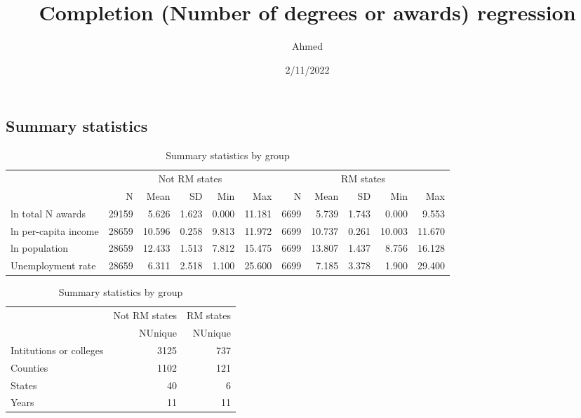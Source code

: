 \documentclass[
  landscape]{article}
\title{Completion (Number of degrees or awards) regression}
\author{Ahmed}
\date{2/11/2022}
\begin{document}
\maketitle

\text{ }

\hypertarget{summary-statistics}{%
\subsection{Summary statistics}\label{summary-statistics}}

\text{ }

\begin{table}

\caption{\label{tab:unnamed-chunk-3}Summary statistics by group}
\centering
\begin{tabular}[t]{lrrrrrrrrrr}
\toprule
\multicolumn{1}{c}{ } & \multicolumn{5}{c}{Not RM states} & \multicolumn{5}{c}{RM states} \\
\cmidrule(l{3pt}r{3pt}){2-6} \cmidrule(l{3pt}r{3pt}){7-11}
  & N & Mean & SD & Min & Max & N  & Mean  & SD  & Min  & Max \\
\midrule
ln total N awards & 29159 & \num{5.626} & \num{1.623} & \num{0.000} & \num{11.181} & 6699 & \num{5.739} & \num{1.743} & \num{0.000} & \num{9.553}\\
ln per-capita income & 28659 & \num{10.596} & \num{0.258} & \num{9.813} & \num{11.972} & 6699 & \num{10.737} & \num{0.261} & \num{10.003} & \num{11.670}\\
ln population & 28659 & \num{12.433} & \num{1.513} & \num{7.812} & \num{15.475} & 6699 & \num{13.807} & \num{1.437} & \num{8.756} & \num{16.128}\\
Unemployment rate & 28659 & \num{6.311} & \num{2.518} & \num{1.100} & \num{25.600} & 6699 & \num{7.185} & \num{3.378} & \num{1.900} & \num{29.400}\\
\bottomrule
\end{tabular}
\end{table}

\text{ }
\begin{table}

\caption{\label{tab:unnamed-chunk-3}Summary statistics by group}
\centering
\begin{tabular}[t]{lrr}
\toprule
\multicolumn{1}{c}{ } & \multicolumn{1}{c}{Not RM states} & \multicolumn{1}{c}{RM states} \\
\cmidrule(l{3pt}r{3pt}){2-2} \cmidrule(l{3pt}r{3pt}){3-3}
  & NUnique & NUnique \\
\midrule
Intitutions or colleges & 3125 & 737\\
Counties & 1102 & 121\\
States & 40 & 6\\
Years & 11 & 11\\
\bottomrule
\end{tabular}
\end{table}
\end{document}
